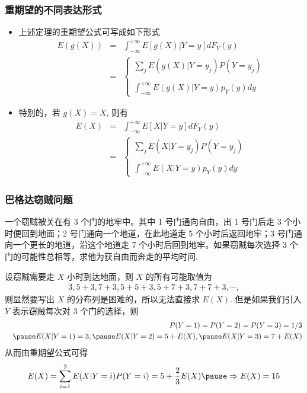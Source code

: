 \begin{frame}
	\frametitle{重期望的不同表达形式}
	\begin{itemize}[<+-|alert@+>]
		\item 上述定理的重期望公式可写成如下形式
		\begin{eqnarray*}
			E(g(X))&=&\int_{-\infty}^{+\infty}E[g(X)|Y=y]dF_Y(y)\\
			&=&\left\{
			\begin{array}{l}
				\sum_jE(g(X)|Y=y_j)P(Y=y_j)\\
				\\
				\int_{-\infty}^{+\infty}E(g(X)|Y=y)p_Y(y)dy
			\end{array}
			\right.
		\end{eqnarray*}
		\item 特别的，若 $g (X)=X$, 则有
		\begin{eqnarray*}
			E(X)&=&\int_{-\infty}^{+\infty}E[X|Y=y]dF_Y(y)\\
			&=&\left\{
			\begin{array}{l}
				\sum_jE(X|Y=y_j)P(Y=y_j)\\
				\\
				\int_{-\infty}^{+\infty}E(X|Y=y)p_Y(y)dy
			\end{array}
			\right.
		\end{eqnarray*}

	\end{itemize}
\end{frame}
\begin{frame}
	\frametitle{巴格达窃贼问题}
	\begin{exam}
		一个窃贼被关在有 3 个门的地牢中。其中 1 号门通向自由，出 1 号门后走 3 个小时便回到地面；2 号门通向一个地道，在此地道走 5 个小时后返回地牢；3 号门通向一个更长的地道，沿这个地道走 7 个小时后回到地牢。如果窃贼每次选择 3 个门的可能性总相等，求他为获自由而奔走的平均时间.
	\end{exam}

	\pause \jieda 设窃贼需要走 $X$ 小时到达地面，则 $X$ 的所有可能取值为
	\begin{eqnarray*}
		3, 5+3, 7+3, 5+5+3, 5+7+3, 7+7+3,\cdots,
	\end{eqnarray*}
	则显然要写出 $X$ 的分布列是困难的，所以无法直接求 $E (X)$. \pause 但是如果我们引入 $Y$ 表示窃贼每次对 3 个门的选择，则 \pause
	\begin{eqnarray*}
		&&P(Y=1)=P(Y=2)=P(Y=3)=1/3\\
		&&\pause E(X|Y=1)=3, \pause E(X|Y=2)=5+E(X), \pause E(X|Y=3)=7+E(X)
	\end{eqnarray*}
	\pause 从而由重期望公式可得
	\begin{eqnarray*}
		E(X)=\sum_{i=1}^3E(X|Y=i)P(Y=i)=5+\dfrac{2}{3}E(X)\pause \Rightarrow E(X)=15
	\end{eqnarray*}
\end{frame}
